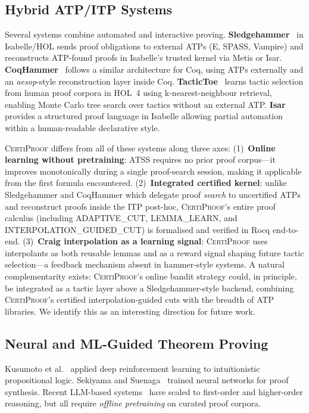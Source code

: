 \documentclass[acmtocl,review,anonymous]{acmart}
\newcommand{\CP}{\textsc{CertiProof}}
\begin{document}
\subsection{Hybrid ATP/ITP Systems}
\label{sec:related-hybrid}

Several systems combine automated and interactive proving.
\textbf{Sledgehammer}~\cite{SledgehammerBohme2010} in Isabelle/HOL
sends proof obligations to external ATPs (E, SPASS, Vampire) and
reconstructs ATP-found proofs in Isabelle's trusted kernel via
Metis or Isar.  \textbf{CoqHammer}~\cite{CoqHammerCzajka2018} follows
a similar architecture for Coq, using ATPs externally and an
\emph{aesop}-style reconstruction layer inside Coq.
\textbf{TacticToe}~\cite{TacticToe2017} learns tactic selection
from human proof corpora in HOL~4 using k-nearest-neighbour
retrieval, enabling Monte Carlo tree search over tactics without
an external ATP.  \textbf{Isar}~\cite{Isar2007} provides a
structured proof language in Isabelle allowing partial automation
within a human-readable declarative style.

\CP{} differs from all of these systems along three axes:
(1)~\textbf{Online learning without pretraining}: ATSS requires no
prior proof corpus---it improves monotonically during a single
proof-search session, making it applicable from the first formula
encountered.
(2)~\textbf{Integrated certified kernel}: unlike Sledgehammer and
CoqHammer which delegate proof \emph{search} to uncertified ATPs
and reconstruct proofs inside the ITP post-hoc, \CP{}'s entire
proof calculus (including ADAPTIVE\_CUT, LEMMA\_LEARN, and
INTERPOLATION\_GUIDED\_CUT) is formalised and verified in Rocq
end-to-end.
(3)~\textbf{Craig interpolation as a learning signal}: \CP{} uses
interpolants as both reusable lemmas and as a reward signal shaping
future tactic selection---a feedback mechanism absent in hammer-style
systems.
A natural complementarity exists: \CP{}'s online bandit strategy
could, in principle, be integrated as a tactic layer above a
Sledgehammer-style backend, combining \CP{}'s certified
interpolation-guided cuts with the breadth of ATP libraries.
We identify this as an interesting direction for future work.

\subsection{Neural and ML-Guided Theorem Proving}

Kusumoto et al.~\cite{KusumoYahata2018} applied deep reinforcement
learning to intuitionistic propositional logic.
Sekiyama and Suenaga~\cite{SekiyamaSuenaga2018} trained neural
networks for proof synthesis.  Recent LLM-based
systems~\cite{DeepSeekProver2024,SongYangAnandkumar2024,LiSurvey2024,
AnLLM2024,ZhaoSubgoalXL2024,DongMahankali2024,KumarappanLeanAgent2024,
AlphaProof2025,DeepSeekProverV2,ZhaoProverAgent2025}
have scaled to first-order and higher-order reasoning, but all require
\emph{offline pretraining} on curated proof corpora.
\end{document}
